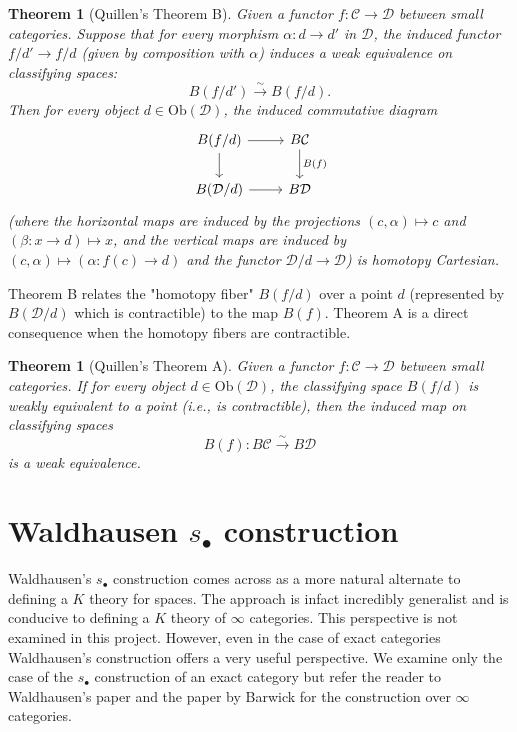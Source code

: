 \documentclass[12pt]{report}
\numberwithin{equation}{section}
\newtheorem{theorem}[dummy]{Theorem}
\begin{document}
	\begin{theorem}[Quillen's Theorem B]
		\label{thm:quillen_B}
		Given a functor $f: \mathcal{C} \to \mathcal{D}$ between small categories. Suppose that for every morphism $\alpha: d \to d'$ in $\mathcal{D}$, the induced functor $f/d' \to f/d$ (given by composition with $\alpha$) induces a weak equivalence on classifying spaces:
		\[ B(f/d') \xrightarrow{\sim} B(f/d). \]
		Then for every object $d \in \mathrm{Ob}(\mathcal{D})$, the induced commutative diagram
		\[
		\begin{tikzcd}
			B(f/d) \arrow{r} \arrow{d} & B\mathcal{C} \arrow{d}{B(f)} \\
			B(\mathcal{D}/d) \arrow{r} & B\mathcal{D}
		\end{tikzcd}
		\]
		(where the horizontal maps are induced by the projections $(c, \alpha) \mapsto c$ and $(\beta: x \to d) \mapsto x$, and the vertical maps are induced by $(c, \alpha) \mapsto (\alpha: f(c) \to d)$ and the functor $\mathcal{D}/d \to \mathcal{D}$) is homotopy Cartesian.
	\end{theorem}
	
	Theorem B relates the "homotopy fiber" $B(f/d)$ over a point $d$ (represented by $B(\mathcal{D}/d)$ which is contractible) to the map $B(f)$. Theorem A is a direct consequence when the homotopy fibers are contractible.
	
	\begin{theorem}[Quillen's Theorem A]
		\label{thm:quillen_A}
		Given a functor $f: \mathcal{C} \to \mathcal{D}$ between small categories. If for every object $d \in \mathrm{Ob}(\mathcal{D})$, the classifying space $B(f/d)$ is weakly equivalent to a point (i.e., is contractible), then the induced map on classifying spaces
		\[ B(f): B\mathcal{C} \xrightarrow{\sim} B\mathcal{D} \]
		is a weak equivalence.
	\end{theorem}
	
	
	\chapter{Waldhausen \( s_\bullet \) construction}
	
	Waldhausen's \( s_\bullet \) construction comes across as a more natural alternate to defining a \( K \) theory for spaces. The approach is infact incredibly generalist and is conducive to defining a \( K \) theory of \( \infty \) categories. This perspective is not examined in this project. However, even in the case of exact categories Waldhausen's construction offers a very useful perspective. We examine only the case of the \( s_\bullet \) construction of an exact category but refer the reader to Waldhausen's paper \cite{10.1007/BFb0074449} and the paper by Barwick \cite{Barwick_2016} for the construction over \( \infty \) categories.
	
\end{document}
